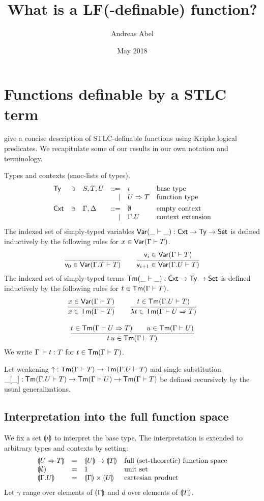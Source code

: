 \documentclass[a4paper]{article}
\title{What is a LF(-definable) function?}
\author{Andreas Abel}
\date{May 2018}
\newcommand{\wk}{\mathord{\uparrow}}
\begin{document}
\maketitle

\section{Functions definable by a STLC term}

\cite{jungTiuryn:tlca93} give a concise description of STLC-definable
functions using Kripke logical predicates.
We recapitulate some of our results in our own notation and
terminology.

Types and contexts (snoc-lists of types).
\[
\begin{array}{lllrll}
  \mathsf{Ty} & \ni & S,T,U & ::= & \iota & \mbox{base type}
\\ &&& \mid & U \Rightarrow T & \mbox{function type}
\\[1ex]
  \mathsf{Cxt} & \ni & \Gamma,\Delta & ::= & \emptyset & \mbox{empty context}
\\ &&& \mid & \Gamma.U & \mbox{context extension}
\end{array}
\]
The indexed set of simply-typed variables $\mathsf{Var}(\_ \vdash \_) : \mathsf{Cxt} \to \mathsf{Ty} \to \mathsf{Set}_{}$
is defined inductively by the
following rules for $x \in \mathsf{Var}(\Gamma \vdash T)$.
\[
  \ru{}{\ind 0 \in \Var {\Gamma.T} T}
\qquad
  \ru{\ind i \in \Var \Gamma T
    }{\ind{i+1} \in \Var {\Gamma.U} T}
\]
The indexed set of simply-typed terms
$\mathsf{Tm}(\_ \vdash \_) : \mathsf{Cxt} \to \mathsf{Ty} \to \mathsf{Set}_{}$ is defined inductively by the
following rules for $t \in \mathsf{Tm}(\Gamma \vdash T)$.
\begin{gather*}
  \ru{x \in \Var \Gamma T}{x \in \Tm \Gamma T}
\qquad
  \ru{t \in \Tm {\Gamma.U} T}{\lambda t \in \Tm \Gamma {U \To T}}
\\[2ex]
  \ru{t \in \Tm \Gamma {U \To T} \qquad u \in \Tm \Gamma U
    }{t\,u \in \Tm \Gamma T}
\end{gather*}
We write $\Gamma \,\vdash t : T$ for $t \in \mathsf{Tm}(\Gamma \vdash T)$.

Let weakening $\wk : \Tm \Gamma T \to \Tm {\Gamma.U} T$ and
single substitution $\_[\_] : \mathsf{Tm}(\Gamma.U \vdash T) \to \mathsf{Tm}(\Gamma \vdash U) \to \mathsf{Tm}(\Gamma \vdash T)$ be defined recursively by the usual generalizations.

\subsection{Interpretation into the full function space}

We fix a set $\llparenthesis\iota\rrparenthesis$ to interpret the base type.  The
interpretation is extended to arbitrary types and contexts by setting:
\[
\begin{array}{llll}
  \llparenthesis U \Rightarrow T\rrparenthesis & = & \llparenthesis U\rrparenthesis \to \llparenthesis T\rrparenthesis
    & \mbox{full (set-theoretic) function space}
\\
  \llparenthesis\emptyset\rrparenthesis & = & 1
    & \mbox{unit set}
\\
  \llparenthesis\Gamma.U\rrparenthesis & = & \llparenthesis\Gamma\rrparenthesis \times \llparenthesis U\rrparenthesis
    & \mbox{cartesian product}
\end{array}
\]
Let $\gamma$ range over elements of $\llparenthesis\Gamma\rrparenthesis$ and $d$ over
elements of $\llparenthesis T\rrparenthesis$.
\end{document}

